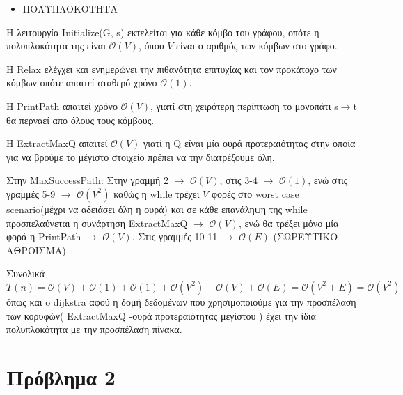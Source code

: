 \documentclass[a4paper,11pt]{article}
\begin{document}
\begin{itemize}
\item ΠΟΛΥΠΛΟΚΟΤΗΤΑ
\end{itemize}

Η λειτουργία Initialize(G, s) εκτελείται για κάθε κόμβο του γράφου, οπότε η πολυπλοκότητα της είναι $\mathcal{O}(V)$, όπου $V$ είναι ο αριθμός των κόμβων στο γράφο.

Η Relax ελέγχει και ενημερώνει την πιθανότητα επιτυχίας και τον προκάτοχο των κόμβων οπότε απαιτεί σταθερό χρόνο $\mathcal{O}(1)$.

Η PrintPath απαιτεί χρόνο $\mathcal{O}(V)$, γιατί στη χειρότερη περίπτωση το μονοπάτι s$\rightarrow$t θα περναεί απο όλους τους κόμβους.

Η ExtractMaxQ απαιτεί $\mathcal{O}(V)$ γιατί η Q είναι μία ουρά προτεραιότητας στην οποία για να βρούμε το μέγιστο στοιχείο πρέπει να την διατρέξουμε όλη.

Στην MaxSuccessPath:
Στην γραμμή 2 $\rightarrow$ $\mathcal{O}(V)$, στις 3-4 $\rightarrow$ $\mathcal{O}(1)$, ενώ στις γραμμές 5-9 $\rightarrow$ $\mathcal{O}(V^2)$ καθώς η while τρέχει $V$ φορές στο worst case scenario(μέχρι να αδειάσει όλη η ουρά) και σε κάθε επανάληψη της while προσπελαύνεται η συνάρτηση ΕxtractMaxQ $\rightarrow$ $\mathcal{O}(V)$, ενώ θα τρέξει μόνο μία φορά η PrintPath $\rightarrow$ $\mathcal{O}(V)$.
Στις γραμμές 10-11 $\rightarrow$ $\mathcal{O}(E)$ (ΣΩΡΕΥΤΙΚΟ ΑΘΡΟΙΣΜΑ)


Συνολικά {\color{red}$$T(n)=\mathcal{O}(V)+\mathcal{O}(1)+\mathcal{O}(1)+\mathcal{O}(V^2)+\mathcal{O}(V)+\mathcal{O}(E)=\mathcal{O}(V^2+E)=\mathcal{O}(V^2)$$} όπως και o dijkstra αφού η δομή δεδομένων που χρησιμοποιούμε για την προσπέλαση των κορυφών( ExtractMaxQ -ουρά προτεραιότητας μεγίστου ) έχει την ίδια πολυπλοκότητα με την προσπέλαση πίνακα.

\newpage

\section*{Πρόβλημα 2}
\end{document}
